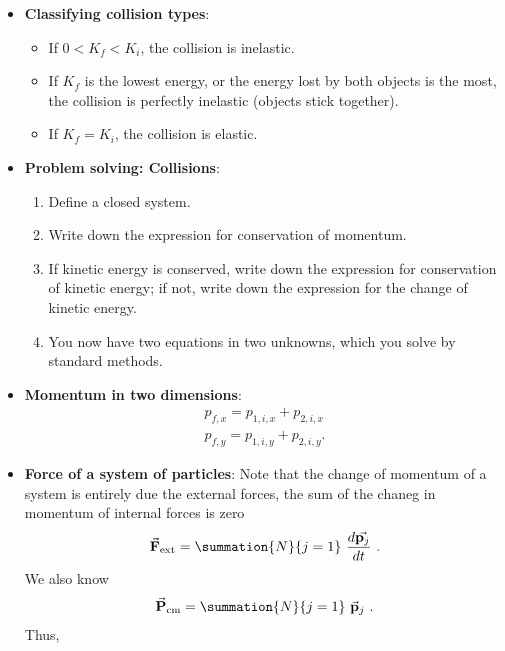 \documentclass{report}
\begin{document}
\begin{itemize}
        \item \textbf{Classifying collision types}:
            \begin{itemize}
                \item If \(0 < K_f < K_i\), the collision is inelastic.
                \item If \(K_f\) is the lowest energy, or the energy lost by both objects is the most, the collision is perfectly inelastic (objects stick together).
                \item If \(K_f = K_i\), the collision is elastic.
            \end{itemize}
        \item \textbf{Problem solving: Collisions}:
            \begin{enumerate}
                \item Define a closed system.
                \item Write down the expression for conservation of momentum.
                \item If kinetic energy is conserved, write down the expression for conservation of kinetic energy; if not, write down the expression for the change of kinetic energy.
                \item You now have two equations in two unknowns, which you solve by standard methods.
            \end{enumerate}
        \item \textbf{Momentum in two dimensions}:
            \begin{align*}
                p_{f,x} = p_{1,i,x} + p_{2,i,x} \\
                p_{f,y} = p_{1,i,y} + p_{2,i,y}
            .\end{align*}
        \item \textbf{Force of a system of particles}: Note that the change of momentum of a system is entirely due the external forces, the sum of the chaneg in momentum of internal forces is zero
            \begin{align*}
                \vec{\mathbf{F}}_{\text{ext}} = \summation{N}{j=1}\ \frac{d\vec{\mathbf{p}_{j}}}{dt}\
            .\end{align*}
            We also know 
            \begin{align*}
                \vec{\mathbf{P}}_{\text{cm}} = \summation{N}{j=1}\ \vec{\mathbf{p}}_{j}\
            .\end{align*}
            \bigbreak \noindent 
            Thus, 
            \begin{align*}

\end{align*}
\end{itemize}
\end{document}
